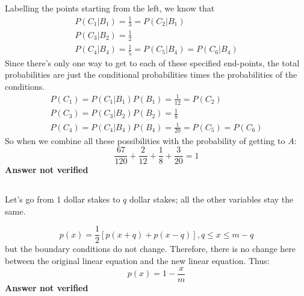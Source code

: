 \subsection{}
Labelling the points starting from the left, we know that
\begin{eqnarray}
	P(C_1|B_1) = \frac{1}{3} = P(C_2|B_1) \\
	P(C_3|B_2) = \frac{1}{2} \\
	P(C_4|B_4) = \frac{1}{5} = P(C_5|B_4) = P(C_6|B_4)
\end{eqnarray}
Since there's only one way to get to each of these specified end-points, the total probabilities are just the conditional probabilities times the probabilities of the conditions.
\begin{eqnarray}
	P(C_1) = P(C_1|B_1)P(B_1) = \frac{1}{12} = P(C_2) \\
	P(C_3) = P(C_3|B_2)P(B_2) = \frac{1}{8} \\
	P(C_4) = P(C_4|B_4)P(B_4) = \frac{1}{20} = P(C_5) = P(C_6)
\end{eqnarray}
So when we combine all these possibilities with the probability of getting to $A$:
\begin{equation}
	\frac{67}{120} + \frac{2}{12} + \frac{1}{8} + \frac{3}{20} = 1
\label{answer3.10}
\end{equation}
\textbf{Answer not verified}


\subsection{}
Let's go from 1 dollar stakes to $q$ dollar stakes; all the other variables stay the same.

\begin{equation}
	p(x) = \frac{1}{2} \left[  p(x+q) + p(x-q)  \right], q \leq x \leq m - q
\end{equation}
but the boundary conditions do not change.  Therefore, there is no change here between the original linear equation and the new linear equation.  Thus:
\begin{equation}
	p(x) = 1 - \frac{x}{m}
\label{answer3.11}
\end{equation}
\textbf{Answer not verified}



